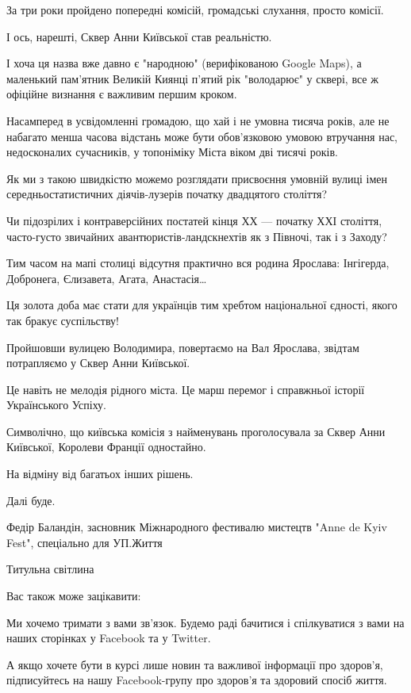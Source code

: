 За три роки пройдено попередні комісій, громадські слухання, просто комісії.

І ось, нарешті, Сквер Анни Київської став реальністю.

І хоча ця назва вже давно є "народною" (верифікованою Google Maps), а маленький
пам’ятник Великій Киянці п’ятий рік "володарює" у сквері, все ж офіційне
визнання є важливим першим кроком.

Насамперед в усвідомленні громадою, що хай і не умовна тисяча років, але не
набагато менша часова відстань може бути обов’язковою умовою втручання нас,
недосконалих сучасників, у топоніміку Міста віком дві тисячі років.

Як ми з такою швидкістю можемо розглядати присвоєння умовній вулиці імен
середньостатистичних діячів-лузерів початку двадцятого століття?

Чи підозрілих і контраверсійних постатей кінця ХХ --- початку ХХІ століття,
часто-густо звичайних авантюристів-ландскнехтів як з Півночі, так і з Заходу?

Тим часом на мапі столиці відсутня практично вся родина Ярослава: Інгігерда,
Добронега, Єлизавета, Агата, Анастасія… 

Ця золота доба має стати для українців тим хребтом національної єдності, якого
так бракує суспільству!

Пройшовши вулицею Володимира, повертаємо на Вал Ярослава, звідтам потрапляємо у
Сквер Анни Київської.

Це навіть не мелодія рідного міста. Це марш перемог і справжньої історії
Українського Успіху.

Символічно, що київська комісія з найменувань проголосувала за Сквер Анни
Київської, Королеви Франції одностайно.

На відміну від багатьох інших рішень.

Далі буде.

Федір Баландін, засновник Міжнародного фестивалю мистецтв "Anne de Kyiv Fest",
спеціально для УП.Життя

Титульна світлина 

Вас також може зацікавити: 

Ми хочемо тримати з вами зв'язок. Будемо раді бачитися і спілкуватися з вами на
наших сторінках у Facebook та у Twitter.

А якщо хочете бути в курсі лише новин та важливої інформації про здоров'я,
підписуйтесь на нашу Facebook-групу про здоров'я та здоровий спосіб життя.
  

